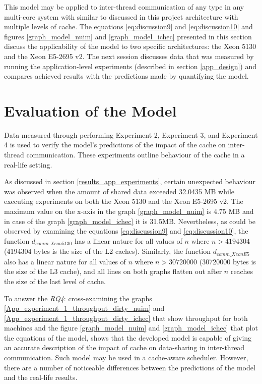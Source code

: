 This model may be applied to inter-thread communication of any type in any multi-core system with similar to discussed in this project architecture with multiple levels of cache. The equations \ref{eq:discussion9} and \ref{eq:discussion10} and figures \ref{graph_model_nuim} and \ref{graph_model_ichec} presented in this section discuss the applicability of the model to two specific architectures: the Xeon 5130 and the Xeon E5-2695 v2. The next session discusses data that was measured by running the application-level experiments (described in section \ref{app_design}) and compares achieved results with the predictions made by quantifying the model.

\section{Evaluation of the Model}

Data measured through performing Experiment 2, Experiment 3, and Experiment 4 is used to verify the model's predictions of the impact of the cache on inter-thread communication. These experiments outline behaviour of the cache in a real-life setting.

As discussed in section \ref{results_app_experiments}, certain unexpected behaviour was observed when the amount of shared data exceeded 32.0435 MB while executing experiments on both the Xeon 5130 and the Xeon E5-2695 v2. The maximum value on the x-axis in the graph \ref{graph_model_nuim} is 4.75 MB and in case of the graph \ref{graph_model_ichec} it is 31.5MB. Nevertheless, as could be observed by examining the equations \ref{eq:discussion9} and \ref{eq:discussion10}, the function $d_{comm\_Xeon5130}$ has a linear nature for all values of $n$ where $n > 4194304$ (4194304 bytes is the size of the L2 caches). Similarly, the function $d_{comm\_XeonE5}$ also has a linear nature for all values of $n$ where $n > 30720000$ (30720000 bytes is the size of the L3 cache), and all lines on both graphs flatten out after $n$ reaches the size of the last level of cache.

To answer the \textit{RQ4}: cross-examining the graphs \ref{App_experiment_1_throughput_dirty_nuim} and \ref{App_experiment_1_throughput_dirty_ichec} that show throughput for both machines and the figure \ref{graph_model_nuim} and \ref{graph_model_ichec} that plot the equations of the model, shows that the developed model is capable of giving an accurate description of the impact of cache on data-sharing in inter-thread communication. Such model may be used in a cache-aware scheduler. However, there are a number of noticeable differences between the predictions of the model and the real-life results.

